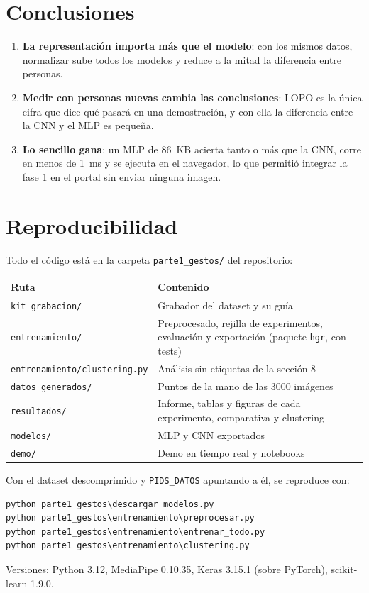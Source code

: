 \documentclass[11pt,a4paper]{article}
\newcommand{\codigo}[1]{\texttt{#1}}
\begin{document}
\section{Conclusiones}

\begin{enumerate}
  \item \textbf{La representación importa más que el modelo}: con los mismos datos, normalizar sube todos los modelos
        y reduce a la mitad la diferencia entre personas.
  \item \textbf{Medir con personas nuevas cambia las conclusiones}: LOPO es la única cifra que dice qué pasará en una
        demostración, y con ella la diferencia entre la CNN y el MLP es pequeña.
  \item \textbf{Lo sencillo gana}: un MLP de 86~KB acierta tanto o más que la CNN, corre en menos de 1~ms y se ejecuta
        en el navegador, lo que permitió integrar la fase 1 en el portal sin enviar ninguna imagen.
\end{enumerate}

\clearpage
\appendix
\section{Reproducibilidad}

Todo el código está en la carpeta \codigo{parte1\_gestos/} del repositorio:

\begin{table}[H]
\centering\small
\begin{tabularx}{\linewidth}{lX}
\toprule
Ruta & Contenido \\
\midrule
\codigo{kit\_grabacion/} & Grabador del dataset y su guía \\
\codigo{entrenamiento/} & Preprocesado, rejilla de experimentos, evaluación y exportación (paquete \codigo{hgr}, con tests) \\
\codigo{entrenamiento/clustering.py} & Análisis sin etiquetas de la sección 8 \\
\codigo{datos\_generados/} & Puntos de la mano de las \num{3000} imágenes \\
\codigo{resultados/} & Informe, tablas y figuras de cada experimento, comparativa y clustering \\
\codigo{modelos/} & MLP y CNN exportados \\
\codigo{demo/} & Demo en tiempo real y notebooks \\
\bottomrule
\end{tabularx}
\end{table}

Con el dataset descomprimido y \codigo{PIDS\_DATOS} apuntando a él, se reproduce con:

\begin{verbatim}
python parte1_gestos\descargar_modelos.py
python parte1_gestos\entrenamiento\preprocesar.py
python parte1_gestos\entrenamiento\entrenar_todo.py
python parte1_gestos\entrenamiento\clustering.py
\end{verbatim}

Versiones: Python 3.12, MediaPipe 0.10.35, Keras 3.15.1 (sobre PyTorch), scikit-learn 1.9.0.
\end{document}
